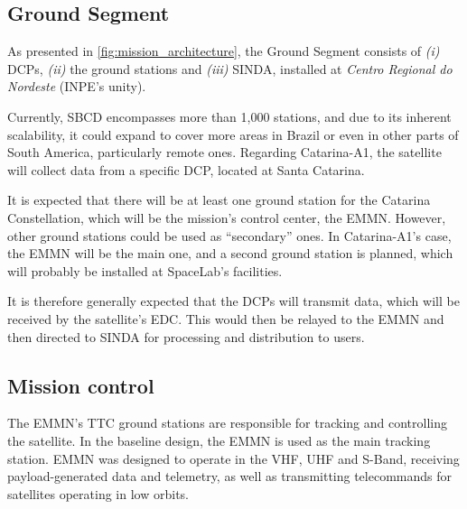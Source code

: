 \subsection{Ground Segment}

As presented in \autoref{fig:mission_architecture}, the Ground Segment consists of \textit{(i)} \acp{DCP}, \textit{(ii)} the ground stations and \textit{(iii)} \ac{SINDA}, installed at \textit{Centro Regional do Nordeste} (\ac{INPE}'s unity).

Currently, \ac{SBCD} encompasses more than 1,000 stations, and due to its inherent scalability, it could expand to cover more areas in Brazil or even in other parts of South America, particularly remote ones. Regarding Catarina-A1, the satellite will collect data from a specific \ac{DCP}, located at Santa Catarina.


It is expected that there will be at least one ground station for the Catarina Constellation, which will be the mission's control center, the \ac{EMMN}. However, other ground stations could be used as ``secondary'' ones. In Catarina-A1's case, the \ac{EMMN} will be the main one, and a second ground station is planned, which will probably be installed at SpaceLab's facilities.


It is therefore generally expected that the \acp{DCP} will transmit data, which will be received by the satellite's \ac{EDC}. This would then be relayed to the \ac{EMMN} and then directed to \ac{SINDA} for processing and distribution to users.

\subsection{Mission control}

The \ac{EMMN}'s \ac{TTC} ground stations are responsible for tracking and controlling the satellite. In the baseline design, the \ac{EMMN} is used as the main tracking station. \ac{EMMN} was designed to operate in the \ac{VHF}, \ac{UHF} and S-Band, receiving payload-generated data and telemetry, as well as transmitting telecommands for satellites operating in low orbits.

